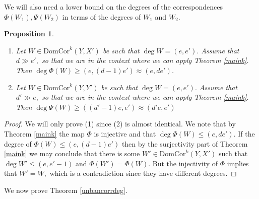 \documentclass[12pt]{amsart}
\numberwithin{equation}{section}
\newtheorem{proposition}[theorem]{Proposition}
\numberwithin{theorem}{section}
\theoremstyle{definition}
\theoremstyle{definition}
\def \DC{{\mathrm{DomCor}}}
\begin{document}
We will also need a  lower bound on the degrees of the correspondences $\Phi (W_1),\Psi(W_2)$ in terms of the degrees of $W_1$ and $W_2.$

\begin{proposition}\label{degreelowerbound}

    \begin{enumerate}
        \item Let $W \in \DC^k(Y, X')$ be such that $\deg W = (e,e').$ Assume that $d \gg e',$ so that we are in the context where we can apply Theorem \ref{maink}.
        Then $\deg \Phi(W) \ge (e, (d-1)e') \approx (e,de')$.
        \item  Let $W \in \DC^k(Y, Y')$ be such that $\deg W = (e,e').$ Assume that $d' \gg e,$ so that we are in the context where we can apply Theorem \ref{maink}.
        Then  $\deg \Psi(W) \ge  ((d'-1)e, e')\approx (d'e,e')$
    \end{enumerate}
\end{proposition}
\begin{proof}
    We will only prove (1) since (2) is almost identical. We note that by Theorem \ref{maink} the map $\Phi$ is injective and that $\deg \Phi(W) \le (e, de')$. If the degree of $\Phi(W) \le (e, (d-1) e')$ then by the surjectivity part of Theorem \ref{maink} we may conclude that there is some $W' \in \DC^k(Y, X')$ such that $\deg W' \le (e, e' -1)$ and $\Phi(W') = \Phi(W).$ But the injectivity of $\Phi$  implies that $W' = W,$ which is a contradiction since they have different degrees.
\end{proof}
We now prove Theorem \ref{unbancorrdeg}.
\end{document}
